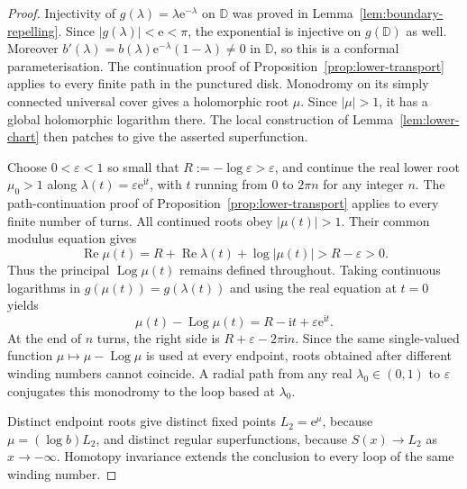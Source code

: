 \documentclass[11pt,a4paper]{article}
\theoremstyle{definition}
\newcommand{\eee}{\mathrm{e}}
\newcommand{\ii}{\mathrm{i}}
\begin{document}
\begin{proof}
Injectivity of $g(\lambda)=\lambda\eee^{-\lambda}$ on $\mathbb D$ was
proved in Lemma~\ref{lem:boundary-repelling}.  Since $|g(\lambda)|<\eee<\pi$,
the exponential is injective on $g(\mathbb D)$ as well.  Moreover
$b'(\lambda)=b(\lambda)\eee^{-\lambda}(1-\lambda)\ne0$ in $\mathbb D$,
so this is a conformal parameterisation.
The continuation proof of Proposition~\ref{prop:lower-transport}
applies to every finite path in the punctured disk.  Monodromy on its
simply connected universal cover gives a holomorphic root $\mu$.
Since $|\mu|>1$, it has a global holomorphic logarithm there.
The local construction of Lemma~\ref{lem:lower-chart} then patches
to give the asserted superfunction.

Choose $0<\varepsilon<1$ so small that
$R:=-\log\varepsilon>\varepsilon$, and continue the real lower root
$\mu_0>1$ along $\lambda(t)=\varepsilon\eee^{\ii t}$, with $t$
running from $0$ to $2\pi n$ for any integer $n$.  The
path-continuation proof of
Proposition~\ref{prop:lower-transport} applies to every finite number
of turns.  All continued roots obey $|\mu(t)|>1$.  Their common
modulus equation gives
\[
 \operatorname{Re}\mu(t)
 =R+\operatorname{Re}\lambda(t)+\log|\mu(t)|
 >R-\varepsilon>0.
\]
Thus the principal $\operatorname{Log}\mu(t)$ remains defined throughout.  Taking
continuous logarithms in $g(\mu(t))=g(\lambda(t))$ and using the real
equation at $t=0$ yields
\[
 \mu(t)-\operatorname{Log}\mu(t)
   =R-\ii t+\varepsilon\eee^{\ii t}.
\]
At the end of $n$ turns, the right side is
$R+\varepsilon-2\pi\ii n$.  Since the same single-valued function
$\mu\mapsto\mu-\operatorname{Log}\mu$ is used at every endpoint, roots obtained
after different winding numbers cannot coincide.  A radial path from
any real $\lambda_0\in(0,1)$ to $\varepsilon$ conjugates this
monodromy to the loop based at $\lambda_0$.

Distinct endpoint roots give distinct fixed points $L_2=\eee^\mu$,
because $\mu=(\log b)L_2$, and distinct regular superfunctions,
because $S(x)\to L_2$ as $x\to-\infty$.  Homotopy invariance extends
the conclusion to every loop of the same winding number.
\end{proof}
\end{document}
